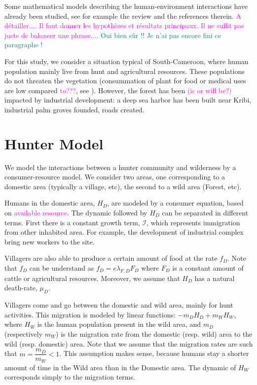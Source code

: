 \documentclass{article}
\newcommand{\lfd}{\lambda_{F, D}}
\newcommand{\cI}{\mathcal{I}}
\newcommand{\marc}[1]{\textcolor{teal}{#1}}
\newcommand{\YD}[1]{\textcolor{magenta}{#1}}
\begin{document}
Some mathematical models describing the human-environment interactions have already been studied, see for example the review \cite{fanuel_modelling_2023} and the references therein. \YD{A détailler.... Il faut donner les hypothèses et résultats principaux. Il ne suffit pas juste de balancer une phrase....} \marc{Oui bien sûr !! Je n'ai pas encore fini ce paragraphe !}

For this study, we consider a situation typical of South-Cameroon, where human population mainly live from hunt and agricultural resources. These populations do not threaten the vegetation (consummation of plant for food or medical uses are low compared \YD{to???}, see \cite{koppert_consommation_1996}). However, the forest has been \YD{(is or will be?)} impacted by industrial development: a deep sea harbor has been built near Kribi, industrial palm groves founded, roads created.

\section{Hunter Model}

We model the interactions between a hunter community and wilderness by a consumer-resource model. We consider two areas, one corresponding to a domestic area (typically a village, etc), the second to a wild area (Forest, etc).

Humans in the domestic area, $H_D$, are modeled by a consumer equation, based on \YD{available resource}. The dynamic followed by $H_D$ can be separated in different terms. 
First there is a constant growth term, $\cI$, which represents immigration from other inhabited area. For example, the development of industrial complex bring new workers to the site.

Villagers are also able to produce a certain amount of food at the rate $f_D$. Note that $f_D$ can be understand as $f_D = e \lfd F_D$ where $F_D$ is a constant amount of cattle or agricultural resources. 
Moreover, we assume that $H_D$ has a natural death-rate, $\mu_D$.

Villagers come and go 
between the domestic and wild area, mainly for hunt activities. This migration is modeled by linear functions: $-m_D H_D + m_W H_W$, where $H_W$ is the human population present in the wild area, and $m_D$ (respectively $m_W$) is the migration rate from the domestic (resp. wild) area to the wild (resp. domestic) area. Note that we assume that the migration rates are such that $m = \dfrac{m_D}{m_W} < 1$. This assumption makes sense, because humans stay a shorter amount of time in the Wild area than in the Domestic area.
The dynamic of $H_W$ corresponds simply to the migration terms. 
\end{document}

